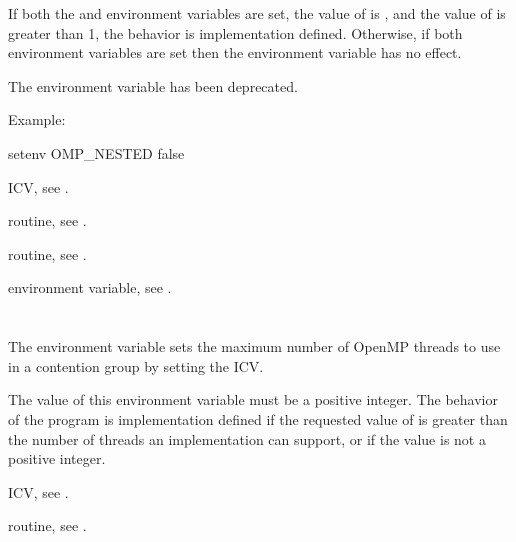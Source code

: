 If both the  and  environment
variables are set, the value of  is , and
the value of  is greater than 1, the behavior is
implementation defined. Otherwise, if both environment variables are set then
the  environment variable has no effect.

The  environment variable has been deprecated.

Example:
\begin{ompEnv}
setenv OMP_NESTED false
\end{ompEnv}

\begin{crossrefs}
\item {} ICV, see .

\item {} routine, see .

\item {} routine, see .

\item {} environment variable, 
see .
\end{crossrefs}



\section{}
\label{sec:OMP_THREAD_LIMIT}
The  environment variable sets the maximum number 
of OpenMP threads to use in a contention group by setting the 
 ICV.

The value of this environment variable must be a positive integer. The 
behavior of the program is implementation defined if the requested value 
of  is greater than the number of threads an 
implementation can support, or if the value is not a positive integer.

\begin{crossrefs}
\item {} ICV, see .

\item {} routine, 
see .
\end{crossrefs}



